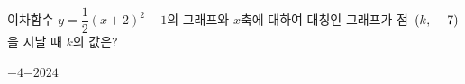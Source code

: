 이차함수 $y=\dfrac{1}{2}(x+2)^2-1$의 그래프와 $x$축에 대하여 대칭인 그래프가 점~$(k{,}\mkern3mu -7)$을 지날 때 $k$의 값은? 
\begin{choices32}{$-4$}{$-2$}{$0$}{$2$}{$4$}\end{choices32}

